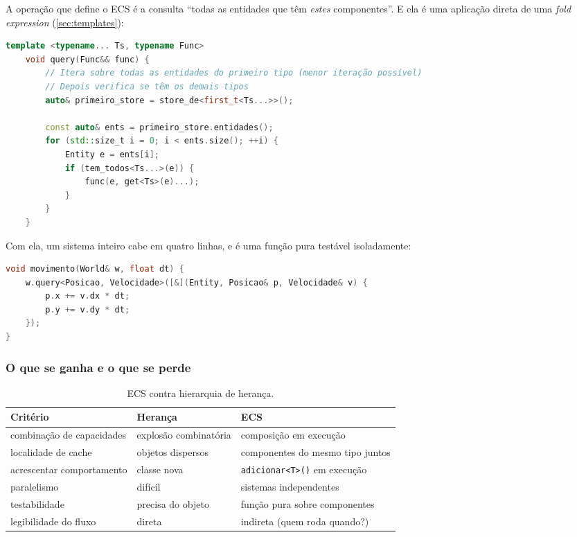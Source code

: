 A operação que define o ECS é a consulta ``todas as entidades que têm
\emph{estes} componentes''. E ela é uma aplicação direta de uma
\emph{fold expression} (\cref{sec:templates}):

\begin{lstlisting}[style=bt, language=C++,
    caption={A \emph{query} genérica, em \texttt{src/ecs/world.hpp}.}]
    template <typename... Ts, typename Func>
    void query(Func&& func) {
        // Itera sobre todas as entidades do primeiro tipo (menor iteração possível)
        // Depois verifica se têm os demais tipos
        auto& primeiro_store = store_de<first_t<Ts...>>();

        const auto& ents = primeiro_store.entidades();
        for (std::size_t i = 0; i < ents.size(); ++i) {
            Entity e = ents[i];
            if (tem_todos<Ts...>(e)) {
                func(e, get<Ts>(e)...);
            }
        }
    }
\end{lstlisting}

Com ela, um sistema inteiro cabe em quatro linhas, e é uma função pura testável
isoladamente:

\begin{lstlisting}[style=bt, language=C++,
    caption={Um sistema completo.}]
void movimento(World& w, float dt) {
    w.query<Posicao, Velocidade>([&](Entity, Posicao& p, Velocidade& v) {
        p.x += v.dx * dt;
        p.y += v.dy * dt;
    });
}
\end{lstlisting}

\subsubsection{O que se ganha e o que se perde}

\begin{table}[htbp]
\centering
\caption{ECS contra hierarquia de herança.}
\label{tab:ecs-heranca}
\footnotesize
\begin{tabular}{@{}lll@{}}
\toprule
\textbf{Critério} & \textbf{Herança} & \textbf{ECS} \\
\midrule
combinação de capacidades   & explosão combinatória & composição em execução \\
localidade de cache         & objetos dispersos     & componentes do mesmo tipo juntos \\
acrescentar comportamento   & classe nova           & \texttt{adicionar<T>()} em execução \\
paralelismo                 & difícil               & sistemas independentes \\
testabilidade               & precisa do objeto     & função pura sobre componentes \\
legibilidade do fluxo       & direta                & indireta (quem roda quando?) \\
\bottomrule
\end{tabular}
\end{table}

